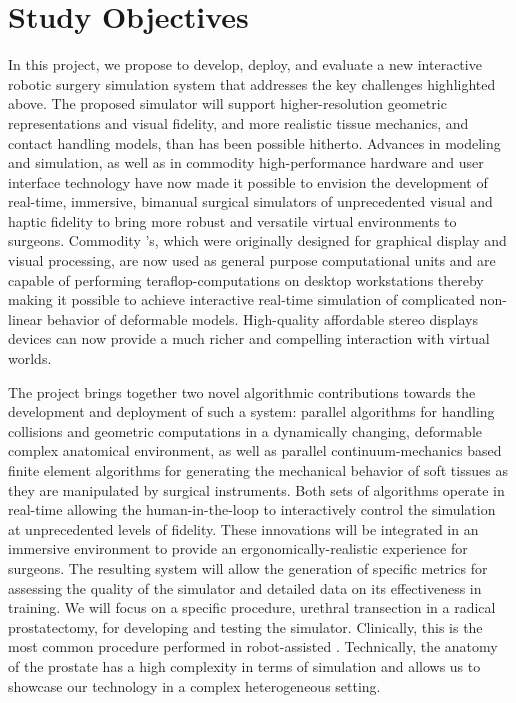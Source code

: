 \section{Study Objectives}\label{sec:objectives}
In this project, we propose to develop, deploy, and evaluate a new interactive robotic surgery simulation system that addresses the key challenges highlighted above. The proposed simulator will support higher-resolution geometric representations and visual fidelity, and more realistic tissue mechanics, and contact handling models, than has been possible hitherto. Advances in modeling and simulation, as well as in commodity high-performance hardware and user interface technology have now made it possible to envision the development of real-time, immersive, bimanual surgical simulators of unprecedented visual and haptic fidelity to bring more robust and versatile virtual environments to surgeons. Commodity 's, which were originally designed for graphical display and visual processing, are now used as general purpose computational units and are capable of performing teraflop-computations on desktop workstations thereby making it possible to achieve interactive real-time simulation of complicated non-linear behavior of deformable models. High-quality affordable stereo displays devices can now provide a much richer and compelling interaction with virtual worlds.

The project brings together two novel algorithmic contributions towards the development and deployment of such a system: parallel  algorithms for handling collisions and geometric computations in a dynamically changing, deformable complex anatomical environment, as well as parallel continuum-mechanics based finite element algorithms for generating the mechanical behavior of soft tissues as they are manipulated by surgical instruments. Both sets of algorithms operate in real-time allowing the human-in-the-loop to interactively control the simulation at unprecedented levels of fidelity. These innovations will be integrated in an immersive environment to provide an ergonomically-realistic experience for surgeons. The resulting system will allow the generation of specific metrics for assessing the quality of the simulator and detailed data on its effectiveness in training. We will focus on a specific procedure, urethral transection in a radical prostatectomy, for developing and testing the simulator. Clinically, this is the most common procedure performed in robot-assisted . Technically, the anatomy of the prostate has a high complexity in terms of simulation and allows us to showcase our technology in a complex heterogeneous setting.

